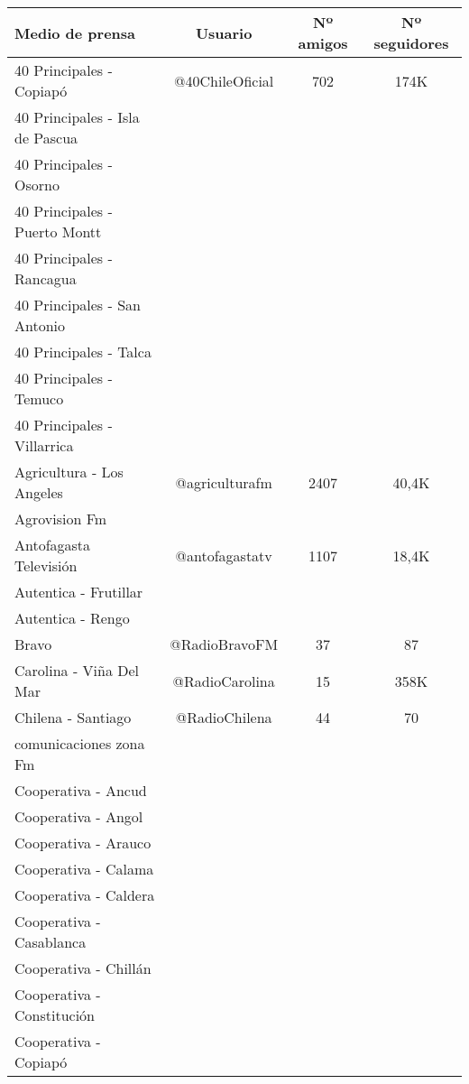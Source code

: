 \begin{center}
	\centering
		\begin{longtable}{| l | c | c | c |}
		\hline
			Medio de prensa    & Usuario  & Nº amigos & Nº seguidores \\ \hline	
40 Principales - Copiapó	&	@40ChileOficial	&	702	&	174K	\\ \hline
40 Principales - Isla de Pascua	&		&		&		\\ \hline
40 Principales - Osorno	&		&		&		\\ \hline
40 Principales - Puerto Montt	&		&		&		\\ \hline
40 Principales - Rancagua	&		&		&		\\ \hline
40 Principales - San Antonio	&		&		&		\\ \hline
40 Principales - Talca	&		&		&		\\ \hline
40 Principales - Temuco	&		&		&		\\ \hline
40 Principales - Villarrica	&		&		&		\\ \hline
Agricultura - Los Angeles	&	@agriculturafm	&	2407	&	40,4K	\\ \hline
Agrovision Fm	&		&		&		\\ \hline
Antofagasta Televisión	&	@antofagastatv	&	1107	&	18,4K	\\ \hline
Autentica - Frutillar	&		&		&		\\ \hline
Autentica - Rengo	&		&		&		\\ \hline
Bravo	&	@RadioBravoFM	&	37	&	87	\\ \hline
Carolina - Viña Del Mar	&	@RadioCarolina	&	15	&	358K	\\ \hline
Chilena - Santiago	&	@RadioChilena	&	44	&	70	\\ \hline
comunicaciones zona Fm	&		&		&		\\ \hline
Cooperativa - Ancud	&		&		&		\\ \hline
Cooperativa - Angol	&		&		&		\\ \hline
Cooperativa - Arauco	&		&		&		\\ \hline
Cooperativa - Calama	&		&		&		\\ \hline
Cooperativa - Caldera	&		&		&		\\ \hline
Cooperativa - Casablanca	&		&		&		\\ \hline
Cooperativa - Chillán	&		&		&		\\ \hline
Cooperativa - Constitución	&		&		&		\\ \hline
Cooperativa - Copiapó	&		&		&		\\ \hline

\end{longtable}
\end{center}
